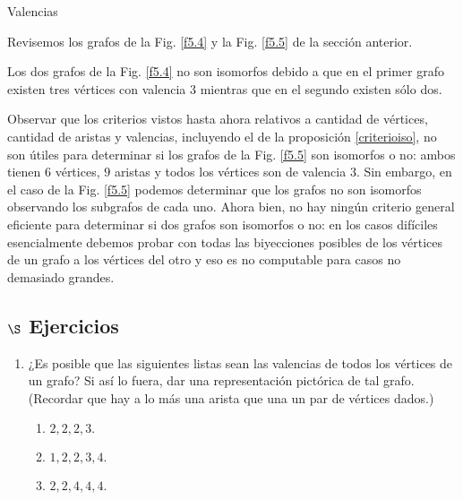 \begin{section}{Valencias}
\begin{ejemplo} Revisemos los grafos de la Fig. \ref{f5.4} y la Fig. \ref{f5.5} de la sección anterior. 

Los dos grafos de la Fig. \ref{f5.4}  no son isomorfos debido a que en el primer grafo existen tres vértices con valencia $3$ mientras que en el segundo existen sólo dos.


Observar que los criterios vistos hasta ahora relativos a cantidad de vértices,  cantidad de aristas y valencias, incluyendo el de la proposición \ref{criterioiso}, no son útiles para determinar si los grafos de  la Fig. \ref{f5.5} son isomorfos o no: ambos tienen $6$ vértices, $9$ aristas y todos los vértices son de valencia $3$. Sin embargo, en el caso de la Fig. \ref{f5.5} podemos determinar que los grafos no son isomorfos observando los subgrafos de cada uno. Ahora bien, no  hay ningún criterio general eficiente para determinar si dos grafos son isomorfos o no: en los casos difíciles esencialmente debemos probar con todas las biyecciones posibles de los vértices de un grafo a los vértices del otro y eso es no computable para casos no demasiado  grandes.   
  
 
\end{ejemplo}

\subsection*{\Large $\S$ Ejercicios}\label{ejercicios5.3}
\begin{enumerate}
\item ¿Es posible que las siguientes listas sean las valencias de todos los vértices de un
grafo? Si así lo fuera, dar una representación pictórica de tal
grafo. (Recordar que hay a lo más una arista que una un par de
vértices dados.)
\begin{multicols}{2}
	\begin{enumerate}
		\item $2,2,2,3.$
		
		\item $1,2,2,3,4.$
		
		\item $2,2,4,4,4.$
		

\end{enumerate}
\end{multicols}
\end{enumerate}
\end{section}
